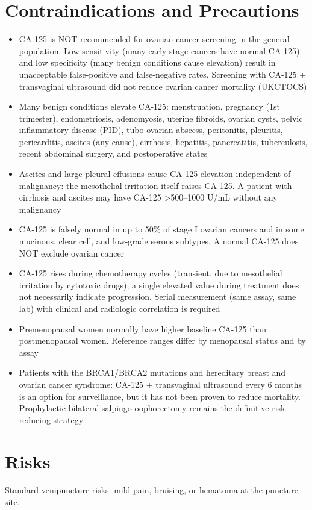 \section*{Contraindications and Precautions}
\begin{itemize}
  \item CA-125 is NOT recommended for ovarian cancer screening in the general population. Low sensitivity (many early-stage cancers have normal CA-125) and low specificity (many benign conditions cause elevation) result in unacceptable false-positive and false-negative rates. Screening with CA-125 + transvaginal ultrasound did not reduce ovarian cancer mortality (UKCTOCS)
  \item Many benign conditions elevate CA-125: menstruation, pregnancy (1st trimester), endometriosis, adenomyosis, uterine fibroids, ovarian cysts, pelvic inflammatory disease (PID), tubo-ovarian abscess, peritonitis, pleuritis, pericarditis, ascites (any cause), cirrhosis, hepatitis, pancreatitis, tuberculosis, recent abdominal surgery, and postoperative states
  \item Ascites and large pleural effusions cause CA-125 elevation independent of malignancy: the mesothelial irritation itself raises CA-125. A patient with cirrhosis and ascites may have CA-125 >500--1000 U/mL without any malignancy
  \item CA-125 is falsely normal in up to 50\% of stage I ovarian cancers and in some mucinous, clear cell, and low-grade serous subtypes. A normal CA-125 does NOT exclude ovarian cancer
  \item CA-125 rises during chemotherapy cycles (transient, due to mesothelial irritation by cytotoxic drugs); a single elevated value during treatment does not necessarily indicate progression. Serial measurement (same assay, same lab) with clinical and radiologic correlation is required
  \item Premenopausal women normally have higher baseline CA-125 than postmenopausal women. Reference ranges differ by menopausal status and by assay
  \item Patients with the BRCA1/BRCA2 mutations and hereditary breast and ovarian cancer syndrome: CA-125 + transvaginal ultrasound every 6 months is an option for surveillance, but it has not been proven to reduce mortality. Prophylactic bilateral salpingo-oophorectomy remains the definitive risk-reducing strategy
\end{itemize}
\section*{Risks}
Standard venipuncture risks: mild pain, bruising, or hematoma at the puncture site.

